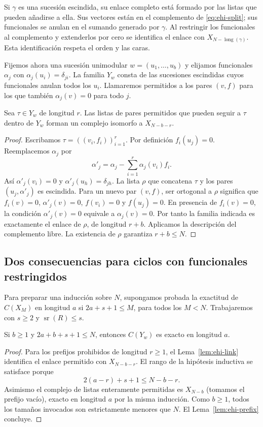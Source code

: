 Si $\gamma$ es una sucesión escindida, su enlace completo está formado por las listas que pueden añadirse a ella. Sus vectores están en el complemento de \eqref{eq:ehi-split}; sus funcionales se anulan en el sumando generado por $\gamma$. Al restringir los funcionales al complemento y extenderlos por cero se identifica el enlace con $X_{N-\operatorname{long}(\gamma)}$. Esta identificación respeta el orden y las caras.

Fijemos ahora una sucesión unimodular $w=(u_1,\ldots,u_b)$ y elijamos funcionales $\alpha_j$ con $\alpha_j(u_i)=\delta_{ji}$. La familia $Y_w$ consta de las sucesiones escindidas cuyos funcionales anulan todos los $u_i$. Llamaremos permitidos a los pares $(v,f)$ para los que también $\alpha_j(v)=0$ para todo $j$.

\begin{lema}
\label{lem:ehi-link}
Sea $\tau\in Y_w$ de longitud $r$. Las listas de pares permitidos que pueden seguir a $\tau$ dentro de $Y_w$ forman un complejo isomorfo a $X_{N-b-r}$.
\end{lema}
\begin{proof}
Escribamos $\tau=((v_i,f_i))_{i=1}^r$. Por definición $f_i(u_j)=0$. Reemplacemos $\alpha_j$ por
\[
 \alpha'_j=\alpha_j-\sum_{i=1}^r\alpha_j(v_i)f_i.
\]
Así $\alpha'_j(v_i)=0$ y $\alpha'_j(u_h)=\delta_{jh}$. La lista $\rho$ que concatena $\tau$ y los pares $(u_j,\alpha'_j)$ es escindida. Para un nuevo par $(v,f)$, ser ortogonal a $\rho$ significa que $f_i(v)=0$, $\alpha'_j(v)=0$, $f(v_i)=0$ y $f(u_j)=0$. En presencia de $f_i(v)=0$, la condición $\alpha'_j(v)=0$ equivale a $\alpha_j(v)=0$. Por tanto la familia indicada es exactamente el enlace de $\rho$, de longitud $r+b$. Aplicamos la descripción del complemento libre. La existencia de $\rho$ garantiza $r+b\le N$.
\end{proof}

\subsection{Dos consecuencias para ciclos con funcionales restringidos}

Para preparar una inducción sobre $N$, supongamos probada la exactitud de $C(X_M)$ en longitud $a$ si $2a+s+1\le M$, para todos los $M<N$. Trabajaremos con $s\ge2$ y $\operatorname{sr}(R)\le s$.

\begin{lema}
\label{lem:ehi-orth}
Si $b\ge1$ y $2a+b+s+1\le N$, entonces $C(Y_w)$ es exacto en longitud $a$.
\end{lema}
\begin{proof}
Para los prefijos prohibidos de longitud $r\ge1$, el Lema~\ref{lem:ehi-link} identifica el enlace permitido con $X_{N-b-r}$. El rango de la hipótesis inductiva se satisface porque
\[
 2(a-r)+s+1\le N-b-r.
\]
Asimismo el complejo de listas enteramente permitidas es $X_{N-b}$ (tomamos el prefijo vacío), exacto en longitud $a$ por la misma inducción. Como $b\ge1$, todos los tamaños invocados son estrictamente menores que $N$. El Lema~\ref{lem:ehi-prefix} concluye.
\end{proof}


